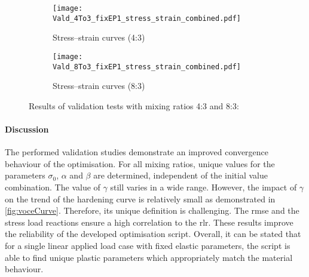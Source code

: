 
\begin{figure}[H]
\centering

\begin{subfigure}[t]{0.495\textwidth}
    \centering
    \texttt{[image: Vald\_4To3\_fixEP1\_stress\_strain\_combined.pdf]}
    \caption{Stress–strain curves (4:3)}
    \label{fig:validStressStrain4to3}
\end{subfigure}
\hfill
\begin{subfigure}[t]{0.495\textwidth}
    \centering
    \texttt{[image: Vald\_8To3\_fixEP1\_stress\_strain\_combined.pdf]}
    \caption{Stress–strain curves (8:3)}
    \label{fig:validStressStrain8to3}
\end{subfigure}
\caption{Results of validation tests with mixing ratios 4:3 and 8:3:}
\label{fig:validStressStrain4and8}
\end{figure}


\paragraph{Discussion}
The performed validation studies demonstrate an improved convergence behaviour of the optimisation. For all mixing ratios, unique values for the parameters $\sigma_0$, $\alpha$ and $\beta$ are determined, independent of the initial value combination. The value of $\gamma$ still varies in a wide range. However, the impact of $\gamma$ on the trend of the hardening curve is relatively small as demonstrated in \autoref{fig:voceCurve}. Therefore, its unique definition is challenging. The \acrshort{rmse} and the stress load reactions ensure a high correlation to the \acrlong{rlr}. These results improve the reliability of the developed optimisation script. Overall, it can be stated that for a single linear applied load case with fixed elastic parameters, the script is able to find unique plastic parameters which appropriately match the material behaviour.


